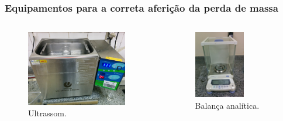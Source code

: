 \documentclass{beamer}
\begin{document}
\begin{frame}
\frametitle{Equipamentos para a correta aferição da perda de massa}

\begin{columns}[c] %
	\begin{figure}
		\centering
		\includegraphics[width=0.9\textwidth]{ultrassom}
		\caption{Ultrassom.}
		\label{fig:ultrassom}
	\end{figure}
	
	
	\begin{figure}
		\centering
		\includegraphics[width=0.6\textwidth]{balanca}
		\caption{Balança analítica.}
		\label{fig:balanca}
	\end{figure}
	
\end{columns}
\end{frame}
\end{document}
